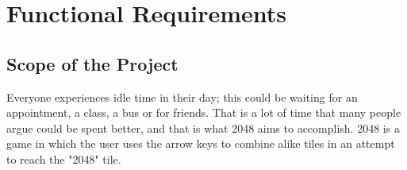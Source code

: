 \documentclass[12pt]{article}
\begin{document}
\section{Functional Requirements}
\subsection{Scope of the Project}
Everyone experiences idle time in their day; this could be waiting for an appointment, a class, a bus or for friends. That is a lot of time that many people argue could be spent better, and that is what 2048 aims to accomplish. 2048 is a game in which the user uses the arrow keys to combine alike tiles in an attempt to reach the "2048" tile. 
\end{document}

